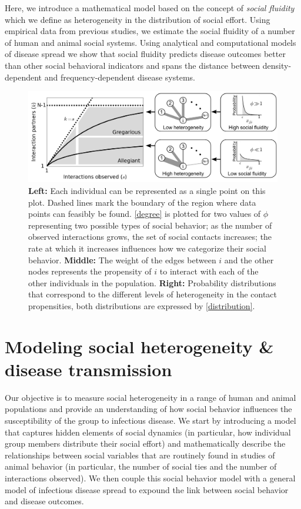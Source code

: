 \documentclass[twocolumn,8pt]{article}
\begin{document}
Here, we introduce a mathematical model based on the concept of \emph{social fluidity} which we define as heterogeneity in the distribution of social effort. Using empirical data from previous studies, we estimate the social fluidity of a number of human and animal social systems. Using analytical and computational models of disease spread we show that social fluidity predicts disease outcomes better than other social behavioral indicators and spans the distance between density-dependent and frequency-dependent disease systems. 

\begin{figure}
  \begin{minipage}[c]{0.67\textwidth}
    \includegraphics[width=\textwidth]{Figures/concept_fig.png}
  \end{minipage}\hfill
  \begin{minipage}[c]{0.3\textwidth}
  \caption{\textbf{Left:} Each individual can be represented as a single point on this plot. Dashed lines mark the boundary of the region where data points can feasibly be found. \eqref{degree} is plotted for two values of $\phi$ representing two possible types of social behavior; as the number of observed interactions grows, the set of social contacts increases; the rate at which it increases influences how we categorize their social behavior. \textbf{Middle:} The weight of the edges between $i$ and the other nodes represents the propensity of $i$ to interact with each of the other individuals in the population. \textbf{Right:} Probability distributions that correspond to the different levels of heterogeneity in the contact propensities, both distributions are expressed by \eqref{distribution}.}\label{concept_fig}
  \end{minipage}
\end{figure}

\section*{Modeling social heterogeneity \& disease transmission}
Our objective is to measure social heterogeneity in a range of human and animal populations and provide an understanding of how social behavior influences the susceptibility of the group to infectious disease. We start by introducing a model that captures hidden elements of social dynamics (in particular, how individual group members distribute their social effort) and mathematically describe the relationships between social variables that are routinely found in studies of animal behavior (in particular, the number of social ties and the number of interactions observed). We then couple this social behavior model with a general model of infectious disease spread to expound the link between social behavior and disease outcomes.
\end{document}
